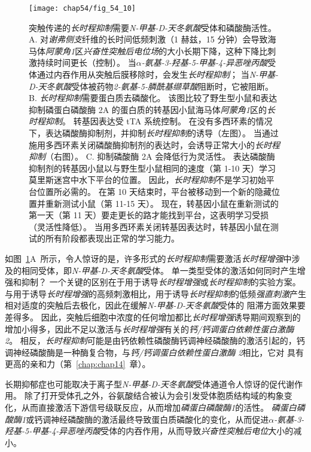\begin{figure}[htbp]
	\centering
	\texttt{[image: chap54/fig\_54\_10]}
	\caption{突触传递的\textit{长时程抑制}需要\textit{N-甲基-D-天冬氨酸}受体和磷酸酶活性。
		A. 对\textit{谢弗侧支}纤维的长时间低频刺激（1 赫兹，15 分钟）会导致海马体\textit{阿蒙角1}区\textit{兴奋性突触后电位场}的大小长期下降，这种下降比刺激持续时间更长（控制）。
		当\textit{$\alpha$-氨基-3-羟基-5-甲基-4-异恶唑丙酸}受体通过内吞作用从突触后膜移除时，会发生\textit{长时程抑制}；
		当\textit{N-甲基-D-天冬氨酸}受体被药物\textit{2-氨基-5-膦酰基缬草酸}阻断时，它被阻断\cite{dudek1992homosynaptic}。
		B. \textit{长时程抑制}需要蛋白质去磷酸化。
		该图比较了野生型小鼠和表达抑制磷蛋白磷酸酶 2A 的蛋白质的转基因小鼠海马体\textit{阿蒙角1}区的\textit{长时程抑制}。
		转基因表达受 tTA 系统控制。
		在没有多西环素的情况下，表达磷酸酶抑制剂，并抑制\textit{长时程抑制}的诱导（左图）。
		当通过施用多西环素关闭磷酸酶抑制剂的表达时，会诱导正常大小的\textit{长时程抑制}（右图）。
		C. 抑制磷酸酶 2A 会降低行为灵活性。
		表达磷酸酶抑制剂的转基因小鼠以与野生型小鼠相同的速度（第 1-10 天）学习莫里斯迷宫中水下平台的位置。
		因此，\textit{长时程抑制}不是学习初始平台位置所必需的。
		在第 10 天结束时，平台被移动到一个新的隐藏位置并重新测试小鼠（第 11-15 天）。
		现在，转基因小鼠在重新测试的第一天（第 11 天）要走更长的路才能找到平台，这表明学习受损（灵活性降低）。
		当用多西环素关闭转基因表达时，转基因小鼠在测试的所有阶段都表现出正常的学习能力\cite{nicholls2008transgenic}。}
	\label{fig:54_10}
\end{figure}


如图~\ref{fig:54_10}A~所示，令人惊讶的是，许多形式的\textit{长时程抑制}需要激活\textit{长时程增强}中涉及的相同受体，即\textit{N-甲基-D-天冬氨酸}受体。
单一类型受体的激活如何同时产生增强和抑制？
一个关键的区别在于用于诱导\textit{长时程增强}或\textit{长时程抑制}的实验方案。
与用于诱导\textit{长时程增强}的高频刺激相比，用于诱导\textit{长时程抑制}的低频\textit{强直刺激}产生相对适度的突触后去极化，因此在缓解\textit{N-甲基-D-天冬氨酸}受体的  阻滞方面效果要差得多。
因此，突触后细胞中浓度的任何增加都比\textit{长时程增强}诱导期间观察到的增加小得多，因此不足以激活与\textit{长时程增强}有关的\textit{钙/钙调蛋白依赖性蛋白激酶 2}。
相反，\textit{长时程抑制}可能是由钙依赖性磷酸酶钙调神经磷酸酶的激活引起的，钙调神经磷酸酶是一种酶复合物，与\textit{钙/钙调蛋白依赖性蛋白激酶 2}相比，它对  具有更高的亲和力（第~\ref{chap:chap14}~章）。


长期抑郁症也可能取决于离子型\textit{N-甲基-D-天冬氨酸}受体通道令人惊讶的促代谢作用。
除了打开受体孔之外，谷氨酸结合被认为会引发受体胞质结构域的构象变化，从而直接激活下游信号级联反应，从而增加\textit{磷蛋白磷酸酶1}的活性。
\textit{磷蛋白磷酸酶1}或钙调神经磷酸酶的激活最终导致蛋白质磷酸化的变化，从而促进\textit{$\alpha$-氨基-3-羟基-5-甲基-4-异恶唑丙酸}受体的内吞作用，从而导致\textit{兴奋性突触后电位}大小的减小。



